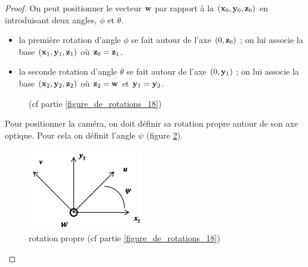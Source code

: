 \begin{proof}
On peut positionner le vecteur $\mathbf{w}$ par rapport à la $(\mathbf{x}_{0},\mathbf{y}_{0},\mathbf{z}_{0}) $ en introduisant deux angles, $\phi$ et $\theta$.

\begin{itemize}
\item la première rotation d'angle $\phi$ se fait autour de l'axe $(0,\mathbf{z}_{0})$ ; on lui associe la base $(\mathbf{x}_{1},\mathbf{y}_{1},\mathbf{z}_{1}) $ où $\mathbf{z}_{0}=\mathbf{z}_{1}$.
\item la seconde rotation d'angle $\theta$ se fait autour de l'axe $(0,\mathbf{y}_1)$ ; on lui associe la base $(\mathbf{x}_{2},\mathbf{y}_{2},\mathbf{z}_{2}) $ où $\mathbf{z}_{2}=\mathbf{w}$ et $\mathbf{y}_{1}=\mathbf{y}_{2}$.
\end{itemize}

\begin{figure}[h!]
\centering
{}
\caption{(cf partie \ref{figure_de_rotations_18})}
\label{img_angles}
\end{figure}

Pour positionner la caméra, on doit définir sa rotation propre autour de son axe optique. Pour cela on définit l'angle $\psi$ (figure \ref{decompgeo_rotationPropre}).
\begin{figure}[h!]
\centering
\includegraphics[width=5cm]{graphe3.jpg}
\caption{rotation propre (cf partie \ref{figure_de_rotations_18})}
\label{decompgeo_rotationPropre}
\end{figure}


\end{proof}
